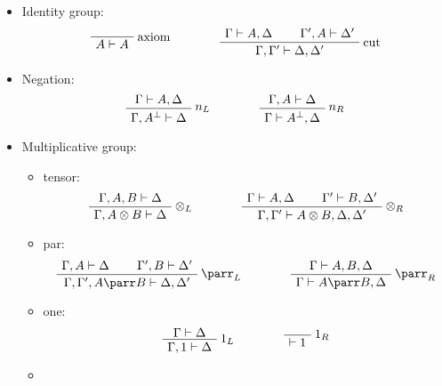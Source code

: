 \begin{itemize}
\tightlist
\item
  Identity group: 
  \begin{equation*}
  \LabelRule{\rulename{axiom}}
  \NulRule{ A \vdash A }
  \DisplayProof
  \qquad\qquad
  \AxRule{ \Gamma \vdash A, \Delta }
  \AxRule{ \Gamma', A \vdash \Delta' }
  \LabelRule{\rulename{cut}}
  \BinRule{ \Gamma, \Gamma' \vdash \Delta, \Delta' }
  \DisplayProof  
  \end{equation*}
\item
  Negation: 
  \begin{equation*}
    \AxRule{ \Gamma \vdash A,\Delta }
    \LabelRule{n_L}
    \UnaRule{\Gamma, A\orth \vdash \Delta }
    \DisplayProof
    \qquad\qquad
    \AxRule{ \Gamma, A \vdash \Delta }
    \LabelRule{n_R}
    \UnaRule{ \Gamma \vdash A\orth, \Delta }
    \DisplayProof
  \end{equation*}
\item
  Multiplicative group:
  \begin{itemize}
  \item
    tensor: 
    \begin{equation*}
      \AxRule{ \Gamma, A, B \vdash \Delta }
      \LabelRule{ \tens_L }
      \UnaRule{ \Gamma, A \tens B \vdash \Delta }
      \DisplayProof
      \qquad\qquad
      \AxRule{ \Gamma \vdash A, \Delta }
      \AxRule{ \Gamma' \vdash B, \Delta' }
      \LabelRule{ \tens_R }
      \BinRule{ \Gamma, \Gamma' \vdash A \tens B, \Delta, \Delta' }
      \DisplayProof      
    \end{equation*}
  \item
    par: 
    \begin{equation*}
      \AxRule{ \Gamma, A \vdash \Delta }
      \AxRule{ \Gamma', B \vdash \Delta' }
      \LabelRule{ \parr_L }
      \BinRule{ \Gamma, \Gamma', A \parr B \vdash \Delta, \Delta' }
      \DisplayProof
      \qquad\qquad
      \AxRule{ \Gamma \vdash A, B, \Delta }
      \LabelRule{ \parr_R }
      \UnaRule{ \Gamma \vdash A \parr B, \Delta }
      \DisplayProof    
    \end{equation*}
  \item
    one:
    \begin{equation*}
       \AxRule{ \Gamma \vdash \Delta }
       \LabelRule{\one_L }
       \UnaRule{ \Gamma, \one \vdash \Delta }
       \DisplayProof
       \qquad\qquad
       \LabelRule{ \one_R }
       \NulRule{ \vdash \one }
       \DisplayProof   
    \end{equation*}
  \item

\end{itemize}
\end{itemize}
